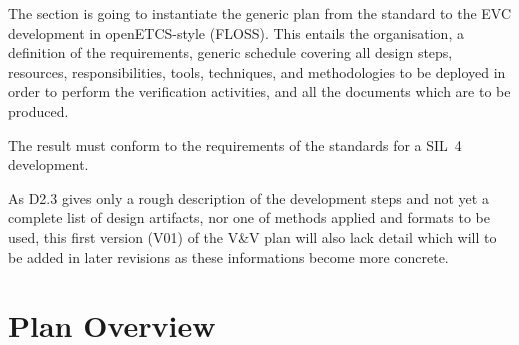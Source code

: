 

The section is going to instantiate the generic \VV plan from the standard to
the EVC development in openETCS-style (FLOSS). This entails the organisation,
a definition of the requirements, 
generic schedule covering all design steps, resources, responsibilities, 
tools, techniques, and methodologies to be 
deployed in order to perform the verification activities, and all the
documents which are to be produced.

The result must conform to the requirements of the standards for a
SIL~4 development.

  As D2.3 gives only a rough description of the development steps and
  not yet a complete list of design artifacts, nor one of methods
  applied and formats to be used, this first version (V01) of the V\&V plan
  will also lack detail which will to be added in later revisions as
  these informations become more concrete.

\section{\VV Plan Overview}
\label{sec:plan-overview}

